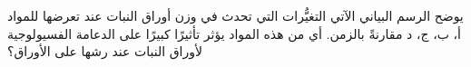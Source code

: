 
\begin{question}

\begin{instance}

\begin{mcq}[standalone=false]

\begin{stem}
يوضح الرسم البياني الآتي التغيُّرات التي تحدث في وزن أوراق النبات عند تعرضها للمواد أ، ب، ج، د مقارنةً بالزمن. أي من هذه المواد يؤثر تأثيرًا كبيرًا على الدعامة الفسيولوجية لأوراق النبات عند رشها على الأوراق؟ \par
{}
\end{stem}

\begin{distractors}
        
\end{distractors}

\end{mcq}

\end{instance}

\end{question}
